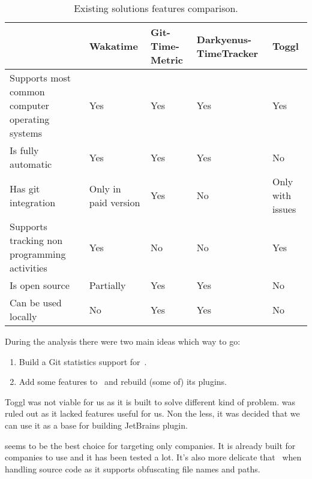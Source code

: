 \begin{table}[h]
    \centering
    \begin{tabular}{ | p{4cm} | p{2.25cm} | p{2.25cm} | p{2.25cm} | p{2.25cm} | }
        \hline
         & Wakatime & Git-Time-Metric & Darkyenus-TimeTracker & Toggl\\
        \hline
        Supports most common computer operating systems & Yes & Yes & Yes & Yes\\
        \hline
        Is fully automatic & Yes & Yes & Yes & No\\
        \hline
        Has git integration & Only in paid version & Yes & No & Only with issues\\
        \hline
        Supports tracking non programming activities & Yes & No & No & Yes\\
        \hline
        Is open source & Partially & Yes & Yes & No\\
        \hline
        Can be used locally & No & Yes & Yes & No\\
        \hline
    \end{tabular}
    \caption{Existing solutions features comparison.}
    \label{tab:comparison-results}
\end{table}

During the analysis there were two main ideas which way to go:
\begin{enumerate}
    \item Build a Git statistics support for~.
    \item Add some features to~ and rebuild (some of) its plugins.
\end{enumerate}

Toggl was not viable for us as it is built to solve different kind of problem.
 was ruled out as it lacked features useful for us.
Non the less, it was decided that we can use it as a base for building JetBrains plugin.

 seems to be the best choice for targeting only companies.
It is already built for companies to use and it has been tested a lot.
It's also more delicate that~ when handling source code as it supports obfuscating file names and paths.

